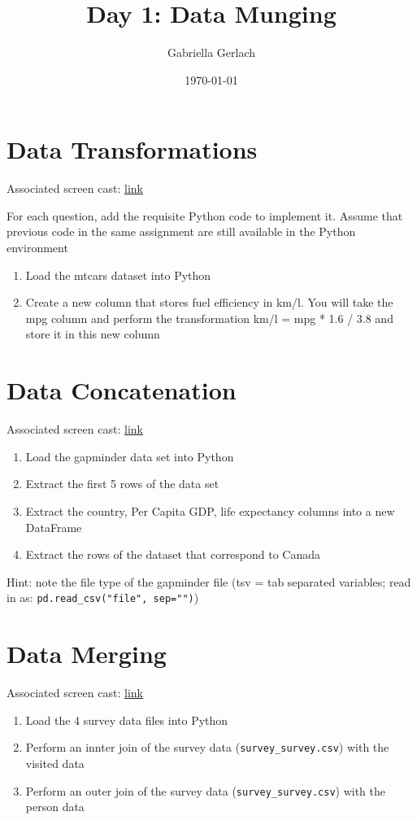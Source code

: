 \documentclass{article}
\title{Day 1: Data Munging}
\author{Gabriella Gerlach}
\date{\today}
\begin{document}
\maketitle
\section{Data Transformations}
Associated screen cast: \href{https://www.youtube.com/watch?v=qdGLTVmeU3k&feature=youtu.be}{link}

For each question, add the requisite Python code to implement it. Assume that previous code in the same assignment are still available in the Python environment
\begin{enumerate}
		\item Load the mtcars dataset into Python
		\item Create a new column that stores fuel efficiency in km/l. You will take the mpg column and perform the transformation km/l = mpg * 1.6 / 3.8 and store it in this new column
\end{enumerate}


\section{Data Concatenation}
Associated screen cast: \href{://www.youtube.com/watch?v=ffwgD8oiAGk&feature=youtu.be}{link}
\begin{enumerate}
		\item Load the gapminder data set into Python
		\item Extract the first 5 rows of the data set
		\item Extract the country, Per Capita GDP, life expectancy columns into a new DataFrame
		\item Extract the rows of the dataset that correspond to Canada
\end{enumerate}
Hint: note the file type of the gapminder file (tsv = tab separated variables; read in as: \texttt{pd.read\_csv("file", sep="")})
\section{Data Merging}
Associated screen cast: \href{https://www.youtube.com/watch?v=LqW_jlgmWPI&feature=youtu.be}{link}
\begin{enumerate}
		\item Load the 4 survey data files into Python
		\item Perform an innter join of the survey data (\texttt{survey\_survey.csv}) with the visited data
		\item Perform an outer join of the survey data (\texttt{survey\_survey.csv}) with the person data
\end{enumerate}
\end{document}
